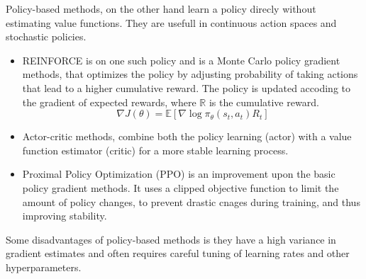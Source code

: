 Policy-based methods, on the other hand learn a policy direcly without estimating
value functions. They are usefull in continuous action spaces and stochastic policies.
\begin{itemize}
      \item REINFORCE is on one such policy and is a Monte Carlo policy gradient methods, 
      that optimizes the policy by adjusting probability of taking actions that lead to a 
      higher cumulative reward. The policy is updated accoding to the gradient of expected rewards,
      where \(\mathbb{R}\) is the cumulative reward. \cite{Types-of-Reinforcement-Learning}
      \begin{equation}
            \nabla J(\theta) = \mathbb{E} \left[\nabla \log \pi_{\theta}(s_t,a_t) R_t \right]
      \end{equation}
      \item Actor-critic methods, combine both the policy learning (actor) with a value
      function estimator (critic) for a more stable learning process. \cite{Types-of-Reinforcement-Learning}
      \item Proximal Policy Optimization (PPO) is an improvement upon the basic policy
      gradient methods. It uses a clipped objective function to limit the amount of policy 
      changes, to prevent drastic cnages during training, and thus improving stability. \cite{Types-of-Reinforcement-Learning}
\end{itemize}
Some disadvantages of policy-based methods is they have a high variance in gradient estimates and often requires careful 
tuning of learning rates and other hyperparameters. \cite{Types-of-Reinforcement-Learning}

